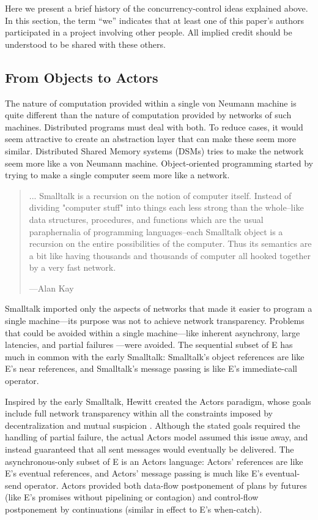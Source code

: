 \documentclass{llncs}
\begin{document}
Here we present a brief history of the concurrency-control ideas
explained above. In this section, the term ``we'' indicates that at
least one of this paper's authors participated in a project involving
other people. All implied credit should be understood to be shared
with these others.

\subsection{From Objects to Actors}

The nature of computation provided within a single von Neumann machine
is quite different than the nature of computation provided by networks
of such machines. Distributed programs must deal with both. To reduce
cases, it would seem attractive to create an abstraction layer that
can make these seem more similar. Distributed Shared Memory systems
(DSMs) \cite{dsm-survey} tries to make the network seem more like a
von Neumann machine. Object-oriented programming started by trying to
make a single computer seem more like a network.

\begin{quotation}
... Smalltalk is a recursion on the notion of computer itself. Instead
of dividing "computer stuff" into things each less strong than the
whole--like data structures, procedures, and functions which are the
usual paraphernalia of programming languages--each Smalltalk object is
a recursion on the entire possibilities of the computer. Thus its
semantics are a bit like having thousands and thousands of computer
all hooked together by a very fast network.
\begin{flushright}
---Alan Kay \cite{kay:smallhistory}
\end{flushright}
\end{quotation}

Smalltalk imported only the aspects of networks that made it easier to
program a single machine---its purpose was not to achieve network
transparency. Problems that could be avoided within a single
machine---like inherent asynchrony, large latencies, and partial
failures \cite{waldo:note}---were avoided. The sequential subset of E
has much in common with the early Smalltalk: Smalltalk's object
references are like E's near references, and Smalltalk's message
passing is like E's immediate-call operator.

Inspired by the early Smalltalk, Hewitt created the Actors
paradigm\cite{ijcai73*235}, whose goals include full network
transparency within all the constraints imposed by decentralization
and mutual suspicion \cite{hewitt:challenge}. Although the stated
goals required the handling of partial failure, the actual Actors
model assumed this issue away, and instead guaranteed that all sent
messages would eventually be delivered. The asynchronous-only subset
of E is an Actors language: Actors' references are like E's eventual
references, and Actors' message passing is much like E's eventual-send
operator. Actors provided both data-flow postponement of plans by
futures (like E's promises without pipelining or contagion) and
control-flow postponement by continuations (similar in effect to E's
when-catch).
\end{document}
